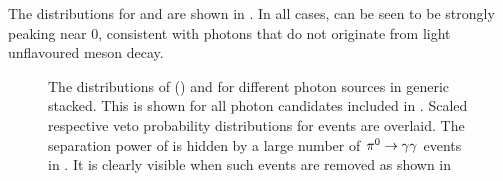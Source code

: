 The distributions for \piVeto and \etaVeto are shown in .
In all cases, \BtoXsgamma can be seen to be strongly peaking near 0, consistent with photons that do not originate from light unflavoured meson decay.

\begin{figure}[htbp!]
    \centering
    \caption{\label{fig:vetos} The distributions of \piVeto () and \etaVeto {} 
    for different photon sources in generic \MC stacked.
    This is shown for all photon candidates included in .
    Scaled respective veto probability distributions for \BtoXsgamma events are overlaid.
    The separation power of \etaVeto is hidden by a large number of $\pi^0\rightarrow\gamma\gamma$ events in .
    It is clearly visible when such events are removed as shown in 
    }
\end{figure}

